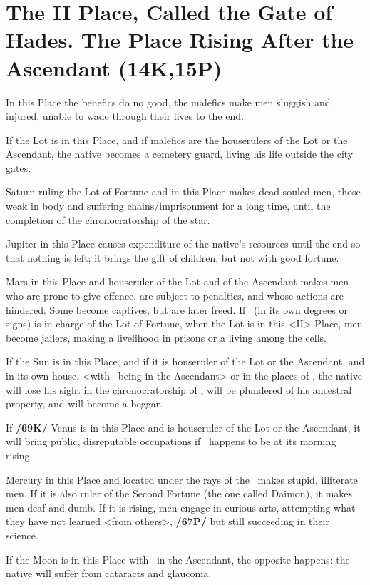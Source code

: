 \section{The II Place, Called the Gate of Hades. The Place Rising After the Ascendant (14K,15P)}
In this Place the benefics do no good, the malefics make men sluggish and injured, unable to wade through their lives to the end. 

If the Lot is in this Place, and if malefics are the houserulers of the Lot or the Ascendant, the native becomes a cemetery guard, living his life outside the city gates. 

Saturn ruling the Lot of Fortune and in this Place makes dead-souled men, those weak in body and suffering
chains/imprisonment for a long time, until the completion of the chronocratorship of the star. 

Jupiter in this Place causes expenditure of the native’s resources until the end so that nothing is left; it brings the gift of children, but not with good fortune. 

Mars in this Place and houseruler of the Lot and of the Ascendant makes men who are prone to give offence, are subject to penalties, and whose actions are hindered. Some become captives, but are later freed. If \Mars\, (in its own degrees or signs) is in charge of the Lot of Fortune, when the Lot is in this <II> Place, men become jailers, making a livelihood in prisons or a living among the cells. 

If the Sun is in this Place, and if it is houseruler of the Lot or the Ascendant, and in its own house, <with \Mars\, being in the Ascendant> or in the places of \Saturn, the native will lose his sight in the chronocratorship of \Mars, will be plundered of his ancestral property, and will become a beggar. 

If \textbf{/69K/} Venus is in this Place and is houseruler of the Lot or the Ascendant, it will bring public, disreputable occupations if \Venus\, happens to be at its morning rising. 

Mercury in this Place and located under the rays of the \Sun\, makes stupid, illiterate men. If it is also ruler of the Second Fortune (the one called Daimon), it makes men deaf and dumb. If it is rising, men engage in curious arts, attempting what they have not learned <from others>, \textbf{/67P/} but still succeeding in their science. 

If the Moon is in this Place with \Saturn\, in the Ascendant, the opposite happens: the native will suffer from cataracts and glaucoma.

\newpage
